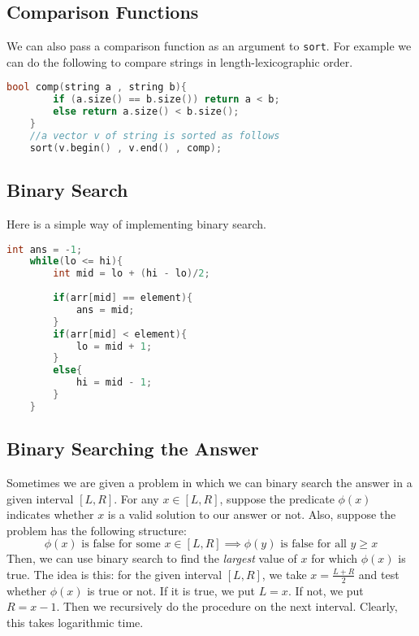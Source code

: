 \documentclass[12pt,a4paper]{amsart}
\numberwithin{equation}{section}
\theoremstyle{definition}
\begin{document}
\subsection{Comparison Functions} We can also pass a comparison function as an argument to \verb|sort|. For example we can do the following to compare strings in length-lexicographic order.
\begin{lstlisting}[language=C++]
    bool comp(string a , string b){
        if (a.size() == b.size()) return a < b;
        else return a.size() < b.size();
    }
    //a vector v of string is sorted as follows
    sort(v.begin() , v.end() , comp);
\end{lstlisting}

\subsection{Binary Search} Here is a simple way of implementing binary search. 

\begin{lstlisting}[language=C++]
    int ans = -1;
    while(lo <= hi){
        int mid = lo + (hi - lo)/2;
    
        if(arr[mid] == element){
            ans = mid;
        }
        if(arr[mid] < element){
            lo = mid + 1;
        }
        else{
            hi = mid - 1;
        }
    }
\end{lstlisting}

\subsection{Binary Searching the Answer} Sometimes we are given a problem in which we can binary search the answer in a given interval $[L , R]$. For any $x\in [L , R]$, suppose the predicate $\phi(x)$ indicates whether $x$ is a valid solution to our answer or not. Also, suppose the problem has the following structure: $$\phi(x)\text{ is false for some $x\in[L , R]$}\implies \phi(y)\text{ is false for all }y\ge x$$
Then, we can use binary search to find the \textit{largest} value of $x$ for which $\phi(x)$ is true. The idea is this: for the given interval $[L , R]$, we take $x = \frac{L + R}{2}$ and test whether $\phi(x)$ is true or not. If it is true, we put $L = x$. If not, we put $R = x - 1$. Then we recursively do the procedure on the next interval. Clearly, this takes logarithmic time.  
\end{document}
